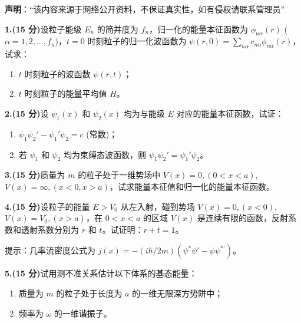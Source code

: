 
\textbf{声明}：“该内容来源于网络公开资料，不保证真实性，如有侵权请联系管理员”

\textbf{1.(15 分)}设粒子能级 $E_n$ 的简并度为 $f_n$，归一化的能量本征函数为 $\phi_{n\alpha}(r)$ ($\alpha = 1,2,\dots,f_n$)，$t = 0$ 时刻粒子的归一化波函数为 $\psi(r,0) = \sum_{n\alpha} c_{n\alpha} \phi_{n\alpha}(r)$，试求：

\begin{enumerate}
    \item $t$ 时刻粒子的波函数 $\psi(r,t)$；
    \item $t$ 时刻粒子的能量平均值 $ \overline{H} $。
\end{enumerate}

\textbf{2.(15 分)}设 $\psi_1(x)$ 和 $\psi_2(x)$ 均为与能级 $E$ 对应的能量本征函数，试证：
\begin{enumerate}
    \item $\psi_1 \psi_2' - \psi_1' \psi_2 = c$ (常数)；
    \item 若 $\psi_1$ 和 $\psi_2$ 均为束缚态波函数，则 $\psi_1 \psi_2' = \psi_1' \psi_2$。
\end{enumerate}

\textbf{3.(15 分)}质量为 $m$ 的粒子处于一维势场中 $V(x) = 0, (0 < x < a)$, $V(x) = \infty, (x < 0, x > a)$，试求能量本征值和归一化的能量本征函数。

\textbf{4.(15 分)}设粒子的能量 $E > V_0$ 从左入射，碰到势场 $V(x) = 0, (x < 0)$, $V(x) = V_0, (x > a)$，在 $0 < x < a$ 的区域 $V(x)$ 是连续有限的函数，反射系数和透射系数分别为 $r$ 和 $t$。试证明：$r + t = 1$。

提示：几率流密度公式为 $j(x) = -(i\hbar/2m)(\psi^*\psi'  - \psi\psi^{*'})$。

\textbf{5.(15 分)}试用测不准关系估计以下体系的基态能量：
\begin{enumerate}
    \item 质量为 $m$ 的粒子处于长度为 $a$ 的一维无限深方势阱中；
    \item 频率为 $\omega$ 的一维谐振子。
\end{enumerate}